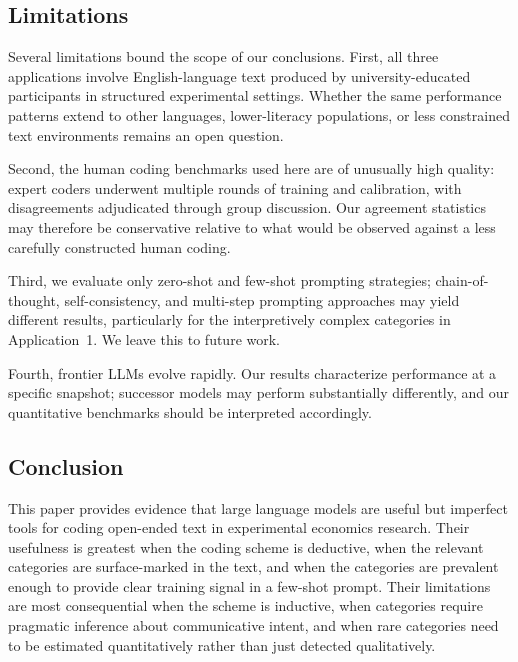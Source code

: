 \documentclass[11pt]{article}
\begin{document}
\begin{sloppypar}
\subsection*{Limitations}

Several limitations bound the scope of our conclusions. First, all three applications involve English-language text produced by university-educated participants in structured experimental settings. Whether the same performance patterns extend to other languages, lower-literacy populations, or less constrained text environments remains an open question.

Second, the human coding benchmarks used here are of unusually high quality: expert coders underwent multiple rounds of training and calibration, with disagreements adjudicated through group discussion. Our agreement statistics may therefore be conservative relative to what would be observed against a less carefully constructed human coding.

Third, we evaluate only zero-shot and few-shot prompting strategies; chain-of-thought, self-consistency, and multi-step prompting approaches may yield different results, particularly for the interpretively complex categories in Application~1. We leave this to future work.

Fourth, frontier LLMs evolve rapidly. Our results characterize performance at a specific snapshot; successor models may perform substantially differently, and our quantitative benchmarks should be interpreted accordingly.


\subsection*{Conclusion}

This paper provides evidence that large language models are useful but imperfect tools for coding open-ended text in experimental economics research. Their usefulness is greatest when the coding scheme is deductive, when the relevant categories are surface-marked in the text, and when the categories are prevalent enough to provide clear training signal in a few-shot prompt. Their limitations are most consequential when the scheme is inductive, when categories require pragmatic inference about communicative intent, and when rare categories need to be estimated quantitatively rather than just detected qualitatively.


\end{sloppypar}
\end{document}
